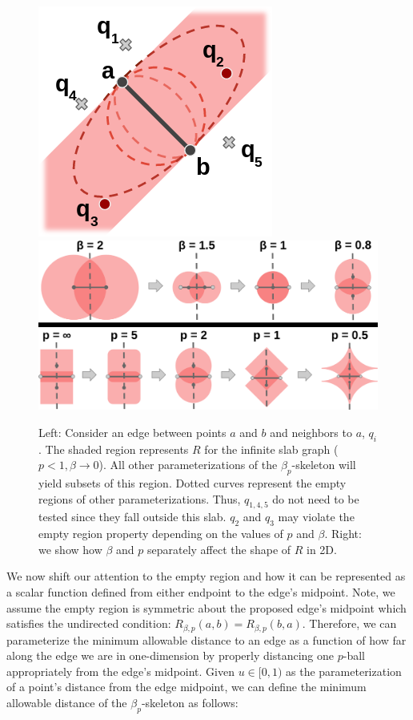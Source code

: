 \begin{figure}[htbp]
    \includegraphics[width=0.34\linewidth]{figs/chap7/infinite_slab.png}
    \includegraphics[width=0.64\linewidth]{figs/chap7/variable_parameters.png}
    \caption{Left: Consider an edge between points $a$ and $b$ and neighbors to $a$, $q_{i}$.
    The shaded region represents $R$ for the infinite slab graph ($p < 1, \beta \rightarrow 0$).
    All other parameterizations of the $\beta_p$-skeleton will yield subsets of this region.
    Dotted curves represent the empty regions of other parameterizations.
    Thus, $q_{1,4,5}$ do not need to be tested since they fall outside this slab.
    $q_2$ and $q_3$ may violate the empty region property depending on the values of $p$ and $\beta$.
    Right: we show how $\beta$ and $p$ separately affect the shape of $R$ in 2D.}
    \label{fig:infinite_slab}
\end{figure}

We now shift our attention to the empty region and how it can be represented as a scalar function defined from either endpoint to the edge's midpoint.
%
Note, we assume the empty region is symmetric about the proposed edge's midpoint which satisfies the undirected condition: $R_{\beta,p}(a,b)=R_{\beta,p}(b,a)$.
%
Therefore, we can parameterize the minimum allowable distance to an edge as a function of how far along the edge we are in one-dimension by properly distancing one $p$-ball appropriately from the edge's midpoint.
%
Given $u \in [0, 1)$ as the parameterization of a point's distance from the edge midpoint, we can define the minimum allowable distance of the $\beta_p$-skeleton as follows:

